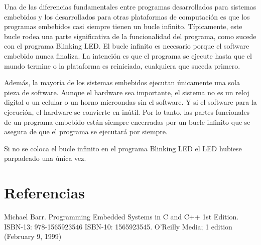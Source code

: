 \documentclass[12pt]{article}
\begin{document}
Una de las diferencias fundamentales entre programas desarrollados para sistemas
embebidos y los desarrollados para otras plataformas de computación es que los programas
embebidos casi siempre tienen un bucle infinito.
Típicamente, este bucle rodea una parte significativa de la funcionalidad
del programa, como sucede con el programa Blinking LED. El bucle infinito
es necesario porque el software embebido nunca finaliza.
La intención es que el programa se ejecute hasta que el mundo termine
o la plataforma es reiniciada, cualquiera que suceda primero.

Además, la mayoría de los sistemas embebidos ejecutan únicamente una sola
pieza de software. Aunque el hardware sea importante, el sistema
no es un reloj digital o un celular o un horno microondas sin el software.
Y si el software para la ejecución, el hardware se convierte en inútil.
Por lo tanto, las partes funcionales de un programa embebido están siempre
encerradas por un bucle infinito que se asegura de que el programa
se ejecutará por siempre.

Si no se coloca el bucle infinito en el programa Blinking LED el LED hubiese
parpadeado una única vez.

\section*{Referencias}

Michael Barr. Programming Embedded Systems in C and C++ 1st Edition. ISBN-13: 978-1565923546
ISBN-10: 1565923545. O'Reilly Media; 1 edition (February 9, 1999)



\end{document}
